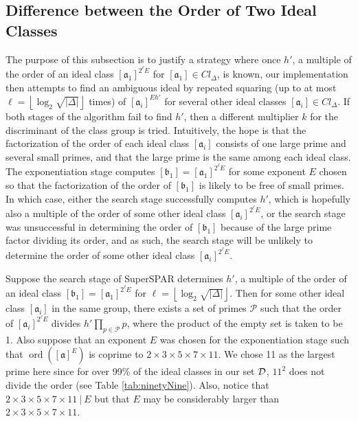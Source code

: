 \documentclass{ucalgthes1}
\theoremstyle{definition}
\DeclareMathOperator{\ord}{ord}
\newcommand{\floor}[1]{\left\lfloor #1 \right\rfloor}
\newcommand{\set}{\mathcal}
\newcommand{\ideal}{\mathfrak}
\newcommand{\idealclass}[1]{\left[ \ideal #1 \right]}
\newcommand{\aclass}{\idealclass a}
\newcommand{\hdelta}{\sqrt{|\Delta|}}
\begin{document}
\subsection{Difference between the Order of Two Ideal Classes}
\label{subsec:ssparDiffBtwOrder}


The purpose of this subsection is to justify a strategy where once $h'$, a multiple of the order of an ideal class $\idealclass{a_1}^{2^\ell E}$ for $\idealclass{a_1} \in Cl_\Delta$, is known, our implementation then attempts to find an ambiguous ideal by repeated squaring (up to at most $\ell = \floor{\log_2 \hdelta}$ times) of $\idealclass{a_i}^{Eh'}$ for several other ideal classes $\idealclass{a_i} \in Cl_\Delta$.  If both stages of the algorithm fail to find $h'$, then a different multiplier $k$ for the discriminant of the class group is tried.  Intuitively, the hope is that the factorization of the order of each ideal class $\idealclass{a_i}$ consists of one large prime and several small primes, and that the large prime is the same among each ideal class.  The exponentiation stage computes $\idealclass{b_1} = \idealclass{a_1}^{2^\ell E}$ for some exponent $E$ chosen so that the factorization of the order of $\idealclass{b_1}$ is likely to be free of small primes.  In which case, either the search stage successfully computes $h'$, which is hopefully also a multiple of the order of some other ideal class $\idealclass{a_i}^{2^\ell E}$, or the search stage was unsuccessful in determining the order of $\idealclass{b_1}$ because of the large prime factor dividing its order, and as such, the search stage will be unlikely to determine the order of some other ideal class $\idealclass{a_i}^{2^\ell E}$.

Suppose the search stage of SuperSPAR determines $h'$, a multiple of the order of an ideal class $\idealclass{b_1} = \idealclass{a_1}^{2^\ell E}$ for $\ell = \floor{\log_2 \hdelta}$.  Then for some other ideal class $\idealclass{a_i}$ in the same group, there exists a set of primes $\set P$ such that the order of $\idealclass{a_i}^{2^\ell E}$ divides $h' \prod_{p \in \set P} p$, where the product of the empty set is taken to be 1.  Also suppose that an exponent $E$ was chosen for the exponentiation stage such that $\ord(\aclass^E)$ is coprime to $2 \times 3 \times 5 \times 7 \times 11$.  We chose 11 as the largest prime here since for over 99\% of the ideal classes in our set $\idealDataSet$, $11^2$ does not divide the order (see Table \ref{tab:ninetyNine}).  Also, notice that $2 \times 3 \times 5 \times 7 \times 11 ~|~ E$ but that $E$ may be considerably larger than $2 \times 3 \times 5 \times 7 \times 11$.
\end{document}
